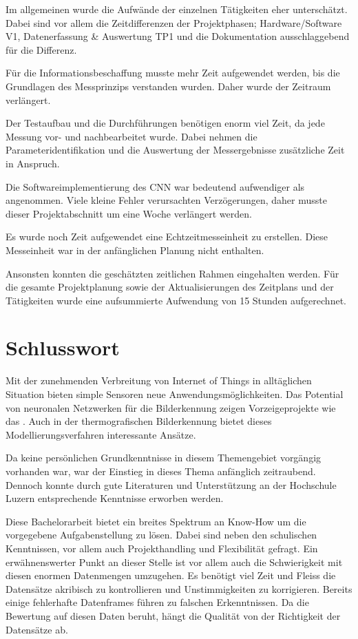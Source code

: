 Im allgemeinen wurde die Aufwände der einzelnen Tätigkeiten eher unterschätzt. Dabei sind vor allem die Zeitdifferenzen der Projektphasen; Hardware/Software V1, Datenerfassung \& Auswertung TP1 und die Dokumentation ausschlaggebend für die Differenz.

Für die Informationsbeschaffung musste mehr Zeit aufgewendet werden, bis die Grundlagen des Messprinzips verstanden wurden. Daher wurde der Zeitraum verlängert.

Der Testaufbau und die Durchführungen benötigen enorm viel Zeit, da jede Messung vor- und nachbearbeitet wurde. Dabei nehmen die Parameteridentifikation und die Auswertung der Messergebnisse zusätzliche Zeit in Anspruch. 

Die Softwareimplementierung des \ac{CNN} war bedeutend aufwendiger als angenommen. Viele kleine Fehler verursachten Verzögerungen, daher musste dieser Projektabschnitt um eine Woche verlängert werden. 

Es wurde noch Zeit aufgewendet eine Echtzeitmesseinheit zu erstellen. Diese Messeinheit war in der anfänglichen Planung nicht enthalten. 

Ansonsten konnten die geschätzten zeitlichen Rahmen eingehalten werden. Für die gesamte Projektplanung sowie der Aktualisierungen des Zeitplans und der Tätigkeiten wurde eine aufsummierte Aufwendung von 15 Stunden aufgerechnet.



\newpage
\section{Schlusswort}
\label{sec:Schlusswort}
Mit der zunehmenden Verbreitung von Internet of Things in alltäglichen Situation bieten simple Sensoren neue Anwendungsmöglichkeiten. Das Potential von neuronalen Netzwerken für die Bilderkennung zeigen Vorzeigeprojekte wie das . Auch in der thermografischen Bilderkennung bietet dieses Modellierungsverfahren interessante Ansätze.

Da keine persönlichen Grundkenntnisse in diesem Themengebiet vorgängig vorhanden war, war der Einstieg in dieses Thema anfänglich zeitraubend. Dennoch konnte durch gute Literaturen und Unterstützung an der Hochschule Luzern entsprechende Kenntnisse erworben werden. 

Diese Bachelorarbeit bietet ein breites Spektrum an Know-How um die vorgegebene Aufgabenstellung zu lösen. Dabei sind neben den schulischen Kenntnissen, vor allem auch Projekthandling und Flexibilität gefragt. Ein erwähnenswerter Punkt an dieser Stelle ist vor allem auch die Schwierigkeit mit diesen enormen Datenmengen umzugehen. Es benötigt viel Zeit und Fleiss die Datensätze akribisch zu kontrollieren und Unstimmigkeiten zu korrigieren. Bereits einige fehlerhafte Datenframes führen zu  falschen Erkenntnissen. Da die Bewertung auf diesen Daten beruht, hängt die Qualität von der Richtigkeit der Datensätze ab.

